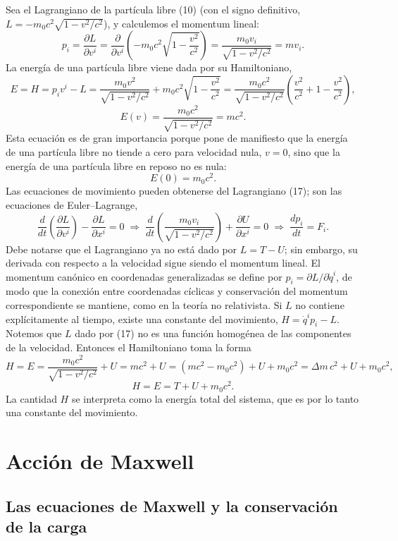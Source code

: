 Sea el Lagrangiano de la partícula libre (10) (con el signo definitivo,
$L=-m_0c^2\sqrt{1-v^2/c^2}$), y calculemos el momentum lineal:
\[
p_i = \frac{\partial L}{\partial v^i} = \frac{\partial}{\partial v^i}
\left(-m_0c^2\sqrt{1-\frac{v^2}{c^2}}\right) = \frac{m_0v_i}{\sqrt{1-v^2/
c^2}} = mv_i . \tag{18}
\]
La energía de una partícula libre viene dada por su Hamiltoniano,
\[
E = H = p_iv^i-L = \frac{m_0v^2}{\sqrt{1-v^2/c^2}}+m_0c^2\sqrt{1-
\frac{v^2}{c^2}} = \frac{m_0c^2}{\sqrt{1-v^2/c^2}}\left(\frac{v^2}{c^2}+
1-\frac{v^2}{c^2}\right),
\]
\[
E(v) = \frac{m_0c^2}{\sqrt{1-v^2/c^2}} = mc^2 . \tag{19}
\]
Esta ecuación es de gran importancia porque pone de manifiesto que la
energía de una partícula libre no tiende a cero para velocidad nula,
$v=0$, sino que la energía de una partícula libre en reposo no es nula:
\[
E(0) = m_0c^2 . \tag{20}
\]
Las ecuaciones de movimiento pueden obtenerse del Lagrangiano (17); son
las ecuaciones de Euler--Lagrange,
\[
\frac{d}{dt}\left(\frac{\partial L}{\partial v^i}\right)-\frac{\partial
L}{\partial x^i}=0 \;\Longrightarrow\; \frac{d}{dt}\left(\frac{m_0v_i}
{\sqrt{1-v^2/c^2}}\right)+\frac{\partial U}{\partial x^i}=0
\;\Longrightarrow\; \frac{dp_i}{dt}=F_i . \tag{21}
\]
Debe notarse que el Lagrangiano ya no está dado por $L=T-U$; sin
embargo, su derivada con respecto a la velocidad sigue siendo el
momentum lineal. El momentum canónico en coordenadas generalizadas se
define por $p_i=\partial L/\partial\dot q^i$, de modo que la conexión
entre coordenadas cíclicas y conservación del momentum correspondiente se
mantiene, como en la teoría no relativista. Si $L$ no contiene
explícitamente al tiempo, existe una constante del movimiento,
$H=\dot q^ip_i-L$. Notemos que $L$ dado por (17) no es una función
homogénea de las componentes de la velocidad. Entonces el Hamiltoniano
toma la forma
\[
H = E = \frac{m_0c^2}{\sqrt{1-v^2/c^2}}+U = mc^2+U = (mc^2-m_0c^2)+U+
m_0c^2 = \Delta m\,c^2+U+m_0c^2,
\]
\[
H = E = T+U+m_0c^2 . \tag{22}
\]
La cantidad $H$ se interpreta como la energía total del sistema, que es
por lo tanto una constante del movimiento.

\section{Acción de Maxwell}

\subsection{Las ecuaciones de Maxwell y la conservación de la carga}

